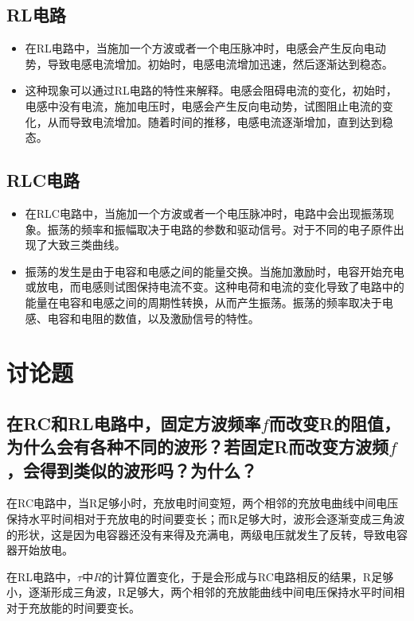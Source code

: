 \documentclass{ctexart}
\begin{document}
\subsection{RL电路}

\begin{itemize}
    \item 在RL电路中，当施加一个方波或者一个电压脉冲时，电感会产生反向电动势，导致电感电流增加。初始时，电感电流增加迅速，然后逐渐达到稳态。
    \item 这种现象可以通过RL电路的特性来解释。电感会阻碍电流的变化，初始时，电感中没有电流，施加电压时，电感会产生反向电动势，试图阻止电流的变化，从而导致电流增加。随着时间的推移，电感电流逐渐增加，直到达到稳态。
\end{itemize}

\subsection{RLC电路}

\begin{itemize}
    \item 在RLC电路中，当施加一个方波或者一个电压脉冲时，电路中会出现振荡现象。振荡的频率和振幅取决于电路的参数和驱动信号。对于不同的电子原件出现了大致三类曲线。
    \item 振荡的发生是由于电容和电感之间的能量交换。当施加激励时，电容开始充电或放电，而电感则试图保持电流不变。这种电荷和电流的变化导致了电路中的能量在电容和电感之间的周期性转换，从而产生振荡。振荡的频率取决于电感、电容和电阻的数值，以及激励信号的特性。
\end{itemize}

\section{讨论题}

\subsection{在RC和RL电路中，固定方波频率$f$而改变R的阻值，为什么会有各种不同的波形？若固定R而改变方波频$f$，会得到类似的波形吗？为什么？}

在RC电路中，当R足够小时，充放电时间变短，两个相邻的充放电曲线中间电压保持水平时间相对于充放电的时间要变长；而R足够大时，波形会逐渐变成三角波的形状，这是因为电容器还没有来得及充满电，两级电压就发生了反转，导致电容器开始放电。

在RL电路中，$\tau$中$R$的计算位置变化，于是会形成与RC电路相反的结果，R足够小，逐渐形成三角波，R足够大，两个相邻的充放能曲线中间电压保持水平时间相对于充放能的时间要变长。
\end{document}
